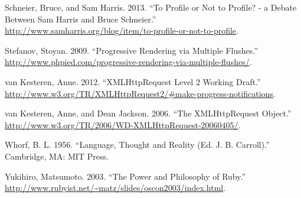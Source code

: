 \documentclass[12pt, ]{article}
\begin{document}
Schneier, Bruce, and Sam Harris. 2013. ``To Profile or Not to Profile? -
a Debate Between Sam Harris and Bruce Schneier.''
\url{http://www.samharris.org/blog/item/to-profile-or-not-to-profile}.

Stefanov, Stoyan. 2009. ``Progressive Rendering via Multiple Flushes.''
\url{http://www.phpied.com/progressive-rendering-via-multiple-flushes/}.

van Kesteren, Anne. 2012. ``XMLHttpRequest Level 2 Working Draft.''
\url{http://www.w3.org/TR/XMLHttpRequest2/\#make-progress-notifications}.

van Kesteren, Anne, and Dean Jackson. 2006. ``The XMLHttpRequest
Object.'' \url{http://www.w3.org/TR/2006/WD-XMLHttpRequest-20060405/}.

Whorf, B. L. 1956. ``Language, Thought and Reality (Ed. J. B.
Carroll).'' Cambridge, MA: MIT Press.

Yukihiro, Matsumoto. 2003. ``The Power and Philosophy of Ruby.''
\url{http://www.rubyist.net/~matz/slides/oscon2003/index.html}.
\end{document}
